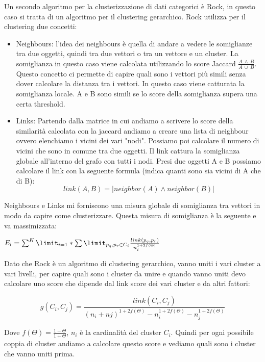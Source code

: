 \documentclass[14pt]{extreport}
\begin{document}
Un secondo algoritmo per la clusterizzazione di dati categorici è Rock, in questo caso si tratta di un algoritmo per il clustering gerarchico. Rock utilizza per il clustering due concetti:
\begin{itemize}
    \item Neighbours: l'idea dei neighbours è quella di andare a vedere le somiglianze tra due oggetti, quindi tra due vettori o tra un vettore e un cluster. La somiglianza in questo caso viene calcolata utilizzando lo score Jaccard $\frac{A\ \land \ B}{A\ \cup \ B}$. Questo concetto ci permette di capire quali sono i vettori più simili senza dover calcolare la distanza tra i vettori. In questo caso viene catturata la somiglianza locale. A e B sono simili se lo score della somiglianza supera una certa threshold.
    \item Links: Partendo dalla matrice in cui andiamo a scrivere lo score della similarità calcolata con la jaccard andiamo a creare una lista di neighbour ovvero elenchiamo i vicini dei vari "nodi". Possiamo poi calcolare il numero di vicini che sono in comune tra due oggetti. Il link cattura la somiglianza globale all'interno del grafo con tutti i nodi.
    Presi due oggetti A e B possiamo calcolare il link con la seguente formula (indica quanti sono sia vicini di A che di B):
    \begin{equation}
        link(A,B) = |neighbor(A) \land neighbor(B)|
    \end{equation}
\end{itemize}

Neighbours e Links mi forniscono una misura globale di somiglianza tra vettori in modo da capire come clusterizzare.
Questa misura di somiglianza è la seguente e va massimizzata:
\newline
\centerline{$E_l = \sum^K \limit_{i=1} * \sum \limit_{p_q,p_r \in C_i}\frac{link(p_q,p_r)}{n_i^{1+2f(\Theta)}}$}

Dato che Rock è un algoritmo di clustering gerarchico, vanno uniti i vari cluster a vari livelli, per capire quali sono i cluster da unire e quando vanno uniti devo calcolare uno score che dipende dal link score dei vari cluster e da altri fattori:

\begin{equation}
    g(C_i,C_j) = \frac{link(C_i,C_j)}{(n_i + nj)^{1+2f(\Theta)}-n_i^{1+2f(\Theta)}-n_j^{1+2f(\Theta)}}
\end{equation}

Dove $f(\Theta) = \frac{1-\Theta}{1+\Theta}$, $n_i$ è la cardinalità del cluster $C_i$.
Quindi per ogni possibile coppia di cluster andiamo a calcolare questo score e vediamo quali sono i cluster che vanno uniti prima.
\end{document}
